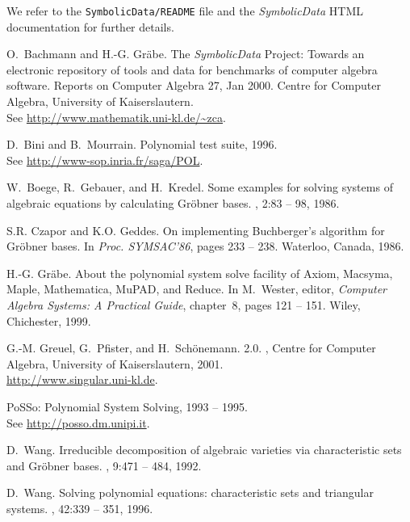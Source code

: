 \documentclass[11pt]{article}
\newcommand{\SD}{{\em Symbo\-lic\-Data}}
\begin{document}
We refer to the {\tt SymbolicData/README} file and the {\SD} HTML
documentation for further details.


%
\begin{thebibliography}{1}

O.~Bachmann and H.-G. Gr\"{a}be.
\newblock The {{\it SymbolicData}} {P}roject: Towards an electronic repository
  of tools and data for benchmarks of computer algebra software.
\newblock Reports on Computer Algebra 27, Jan 2000.
\newblock Centre for Computer Algebra, University of Kaiserslautern.\\ See
  \url{http://www.mathematik.uni-kl.de/~zca}.

D.~Bini and B.~Mourrain.
\newblock Polynomial test suite, 1996.\\
\newblock See \url{http://www-sop.inria.fr/saga/POL}.

W.~Boege, R.~Gebauer, and H.~Kredel.
\newblock Some examples for solving systems of algebraic equations by
  calculating {Gr\"obner} bases.
, 2:83 -- 98, 1986.

S.R. Czapor and K.O. Geddes.
\newblock On implementing {B}uchberger's algorithm for {G}r\"obner bases.
\newblock In {\em Proc. SYMSAC'86}, pages 233 -- 238. Waterloo, Canada, 1986.

H.-G. Gr\"abe.
\newblock About the polynomial system solve facility of {Axiom, Macsyma, Maple,
  Mathematica, MuPAD, and Reduce}.
\newblock In M.~Wester, editor, {\em Computer Algebra Systems: A Practical
  Guide}, chapter~8, pages 121 -- 151. Wiley, Chichester, 1999.

G.-M. Greuel, G.~Pfister, and H.~Sch\"onemann.
 2.0.
, Centre for
  Computer Algebra, University of Kaiserslautern, 2001.\\
\newblock \url{http://www.singular.uni-kl.de}.

{PoSSo}: {Polynomial} {System} {Solving}, 1993 -- 1995.\\
\newblock See \url{http://posso.dm.unipi.it}.

D.~Wang.
\newblock Irreducible decomposition of algebraic varieties via characteristic
  sets and {G}r\"obner bases.
, 9:471 -- 484, 1992.

D.~Wang.
\newblock Solving polynomial equations: characteristic sets and triangular
  systems.
, 42:339 -- 351, 1996.

\end{thebibliography}
\end{document}
